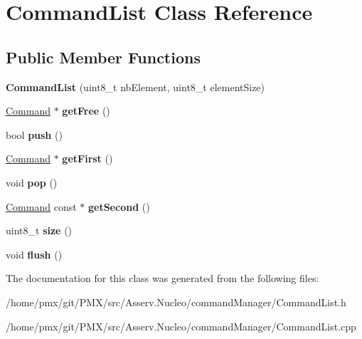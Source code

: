 \hypertarget{classCommandList}{}\section{Command\+List Class Reference}
\label{classCommandList}
\subsection*{Public Member Functions}
\begin{DoxyCompactItemize}
\item 
\mbox{\label{classCommandList_a3ef5d69f90bb164beaf3c7510a368d7e}} 
{\bfseries Command\+List} (uint8\+\_\+t nb\+Element, uint8\+\_\+t element\+Size)
\item 
\mbox{\label{classCommandList_a5e8183aacefa962b7181e2e7a145eefe}} 
\hyperlink{classCommand}{Command} $\ast$ {\bfseries get\+Free} ()
\item 
\mbox{\label{classCommandList_a16ad6b123a9a6fb6ea0fcfeb598a597d}} 
bool {\bfseries push} ()
\item 
\mbox{\label{classCommandList_a783afbd319aea1ab701b643007ffed43}} 
\hyperlink{classCommand}{Command} $\ast$ {\bfseries get\+First} ()
\item 
\mbox{\label{classCommandList_ac91af1b7496b2b71e4f6bfbf1a287bee}} 
void {\bfseries pop} ()
\item 
\mbox{\label{classCommandList_a7a7aee40aef20e550eeaa471da8dec5c}} 
\hyperlink{classCommand}{Command} const  $\ast$ {\bfseries get\+Second} ()
\item 
\mbox{\label{classCommandList_a9c8fe9e28d08d6d1dc8385cca1087f55}} 
uint8\+\_\+t {\bfseries size} ()
\item 
\mbox{\label{classCommandList_a7970130b66d425f9619ab52211fed46c}} 
void {\bfseries flush} ()
\end{DoxyCompactItemize}


The documentation for this class was generated from the following files\+:\begin{DoxyCompactItemize}
\item 
/home/pmx/git/\+P\+M\+X/src/\+Asserv.\+Nucleo/command\+Manager/Command\+List.\+h\item 
/home/pmx/git/\+P\+M\+X/src/\+Asserv.\+Nucleo/command\+Manager/Command\+List.\+cpp\end{DoxyCompactItemize}
